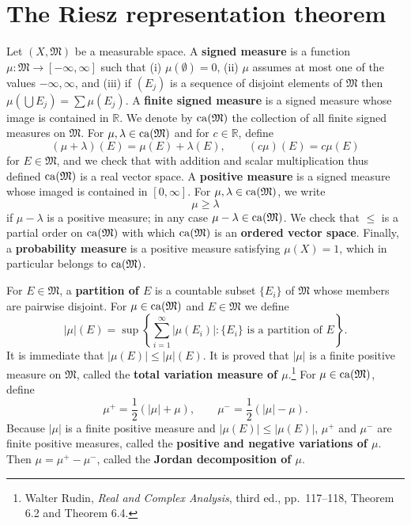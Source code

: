 \documentclass{article}
\newcommand{\ca}{\ensuremath\mathrm{ca}}
\theoremstyle{definition}
\begin{document}
\section{The Riesz representation theorem}
Let $(X,\mathfrak{M})$ be a measurable space. 
A \textbf{signed measure} is a function $\mu:\mathfrak{M} \to [-\infty,\infty]$ such that
(i) $\mu(\emptyset)=0$, (ii) $\mu$ assumes at most one of the values $-\infty,\infty$, and (iii)
 if $(E_j)$ is a sequence of disjoint elements of $\mathfrak{M}$
then $\mu\left(\bigcup E_j\right) = \sum \mu(E_j)$. 
A \textbf{finite signed measure} is a signed measure whose image is contained in $\mathbb{R}$. 
We denote by 
$\ca(\mathfrak{M})$ 
the collection of all finite signed measures on $\mathfrak{M}$. 
For $\mu,\lambda \in \ca(\mathfrak{M})$ and for $c \in \mathbb{R}$, define
\[
(\mu+\lambda)(E) = \mu(E)+\lambda(E),
\qquad (c\mu)(E) = c \mu(E)
\]
for $E \in \mathfrak{M}$, and we check that with addition and scalar multiplication thus defined $\ca(\mathfrak{M})$ is a real vector space.
A \textbf{positive measure} is a 
signed measure whose imaged is contained in $[0,\infty]$. For $\mu,\lambda \in \ca(\mathfrak{M})$, we write 
\[
\mu \geq \lambda
\]
if $\mu-\lambda$ is a positive measure; in any case $\mu-\lambda \in \ca(\mathfrak{M})$. We check that $\leq$ is a partial order
on $\ca(\mathfrak{M})$ with which $\ca(\mathfrak{M})$ is an \textbf{ordered vector space}.
Finally, a \textbf{probability measure} is a positive measure satisfying $\mu(X)=1$, which in
particular belongs to $\ca(\mathfrak{M})$. 

For $E \in \mathfrak{M}$, a \textbf{partition of $E$} is a countable subset $\{E_i\}$
of $\mathfrak{M}$ whose members are pairwise disjoint. 
For $\mu \in \ca(\mathfrak{M})$ and $E \in \mathfrak{M}$ we define
\[
|\mu|(E) = \sup \left\{\sum_{i=1}^\infty |\mu(E_i)|: \textrm{$\{E_i\}$ is a partition of $E$}\right\}.
\]
It is immediate that $|\mu(E)| \leq |\mu|(E)$. 
It is proved that $|\mu|$ is a finite positive measure on $\mathfrak{M}$,
called the \textbf{total variation measure of $\mu$}.\footnote{Walter Rudin, {\em Real
and Complex Analysis}, third ed., pp.~117--118, Theorem 6.2 and Theorem 6.4.}
For $\mu \in \ca(\mathfrak{M})$, define
\[
\mu^+ = \frac{1}{2}(|\mu|+\mu),\qquad
\mu^-=\frac{1}{2}(|\mu|-\mu).
\]
Because $|\mu|$ is a finite positive measure and $|\mu(E)| \leq |\mu(E)|$, 
$\mu^+$ and $\mu^-$ are finite positive measures, called the \textbf{positive and
negative variations of $\mu$}. Then $\mu=\mu^+ -\mu^-$, called the \textbf{Jordan
decomposition of $\mu$}. 
\end{document}
